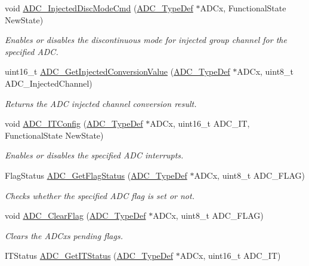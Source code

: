 \begin{DoxyCompactItemize}
void \hyperlink{group___a_d_c_ga0b583b94183fa4ff287177b9ee808092}{A\+D\+C\+\_\+\+Injected\+Disc\+Mode\+Cmd} (\hyperlink{struct_a_d_c___type_def}{A\+D\+C\+\_\+\+Type\+Def} $\ast$A\+D\+Cx, Functional\+State New\+State)
\begin{DoxyCompactList}\small\item\em Enables or disables the discontinuous mode for injected group channel for the specified A\+DC. \end{DoxyCompactList}\item 
uint16\+\_\+t \hyperlink{group___a_d_c_ga1dea5ed24571a2e0ce4cbd41c9c1ec46}{A\+D\+C\+\_\+\+Get\+Injected\+Conversion\+Value} (\hyperlink{struct_a_d_c___type_def}{A\+D\+C\+\_\+\+Type\+Def} $\ast$A\+D\+Cx, uint8\+\_\+t A\+D\+C\+\_\+\+Injected\+Channel)
\begin{DoxyCompactList}\small\item\em Returns the A\+DC injected channel conversion result. \end{DoxyCompactList}\item 
void \hyperlink{group___a_d_c_gad4c84b54b539944f555488bf979f82b6}{A\+D\+C\+\_\+\+I\+T\+Config} (\hyperlink{struct_a_d_c___type_def}{A\+D\+C\+\_\+\+Type\+Def} $\ast$A\+D\+Cx, uint16\+\_\+t A\+D\+C\+\_\+\+IT, Functional\+State New\+State)
\begin{DoxyCompactList}\small\item\em Enables or disables the specified A\+DC interrupts. \end{DoxyCompactList}\item 
Flag\+Status \hyperlink{group___a_d_c_gaa12546e51ec905c90a3aada432bd4633}{A\+D\+C\+\_\+\+Get\+Flag\+Status} (\hyperlink{struct_a_d_c___type_def}{A\+D\+C\+\_\+\+Type\+Def} $\ast$A\+D\+Cx, uint8\+\_\+t A\+D\+C\+\_\+\+F\+L\+AG)
\begin{DoxyCompactList}\small\item\em Checks whether the specified A\+DC flag is set or not. \end{DoxyCompactList}\item 
void \hyperlink{group___a_d_c_gaf34f36798f811b4a41321ea2d12118d4}{A\+D\+C\+\_\+\+Clear\+Flag} (\hyperlink{struct_a_d_c___type_def}{A\+D\+C\+\_\+\+Type\+Def} $\ast$A\+D\+Cx, uint8\+\_\+t A\+D\+C\+\_\+\+F\+L\+AG)
\begin{DoxyCompactList}\small\item\em Clears the A\+D\+Cx\textquotesingle{}s pending flags. \end{DoxyCompactList}\item 
I\+T\+Status \hyperlink{group___a_d_c_gaa1d3b910a83dbf14d4f68c8eef058612}{A\+D\+C\+\_\+\+Get\+I\+T\+Status} (\hyperlink{struct_a_d_c___type_def}{A\+D\+C\+\_\+\+Type\+Def} $\ast$A\+D\+Cx, uint16\+\_\+t A\+D\+C\+\_\+\+IT)

\end{DoxyCompactItemize}
